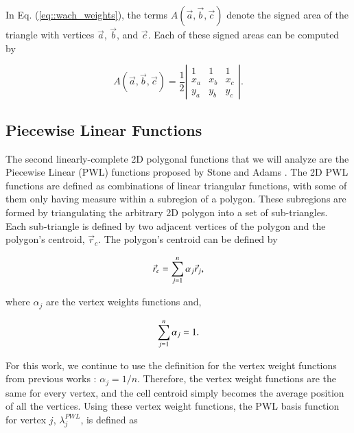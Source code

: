 \documentclass[preprint,10pt]{elsarticle}
\begin{document}
\noindent In Eq. (\ref{eq::wach_weights}), the terms $A(\vec{a}, \vec{b}, \vec{c})$ denote the signed area of the triangle with vertices $\vec{a}$, $\vec{b}$, and $\vec{c}$. Each of these signed areas can be computed by

\begin{equation}
\label{eq::wach_signed_area}
A(\vec{a}, \vec{b}, \vec{c}) = \frac{1}{2}
\left|  
  \begin{array}{ccc}
  1 & 1 & 1 \\
  x_a & x_b & x_c \\
  y_a & y_b & y_c
  \end{array}
\right| .
\end{equation}

\subsection{Piecewise Linear Functions}

The second linearly-complete 2D polygonal functions that we will analyze are the Piecewise Linear (PWL) functions proposed by Stone and Adams \cite{ref::PWLD_stone_adams,ref::PWLD_stone_adams_unstructured}. The 2D PWL functions are defined as combinations of linear triangular functions, with some of them only having measure within a subregion of a polygon. These subregions are formed by triangulating the arbitrary 2D polygon into a set of sub-triangles.  Each sub-triangle is defined by two adjacent vertices of the polygon and the polygon's centroid, $\vec{r}_{c}$. The polygon's centroid can be defined by

\begin{equation}
\label{eq::PWL_2D_centroid}
	\vec{r}_{c} =  \sum\displaylimits_{j=1}^{n} \alpha_{j} \vec{r}_j ,
\end{equation}

\noindent where $\alpha_{j}$ are the vertex weights functions and, 

\begin{equation}
\label{eq::PWL_2D_vertex_weight_sum}
 \sum\displaylimits_{j=1}^{n} \alpha_{j} = 1.
\end{equation}

\noindent For this work, we continue to use the definition for the vertex weight functions from previous works \cite{ref::PWLD_stone_adams,ref::PWLD_stone_adams_unstructured,bailey2008phd}: $\alpha_{j}= 1/n$. Therefore, the vertex weight functions are the same for every vertex, and the cell centroid simply becomes the average position of all the vertices. Using these vertex weight functions, the PWL basis function for vertex $j$, $\lambda_j^{PWL}$, is defined as
\end{document}
